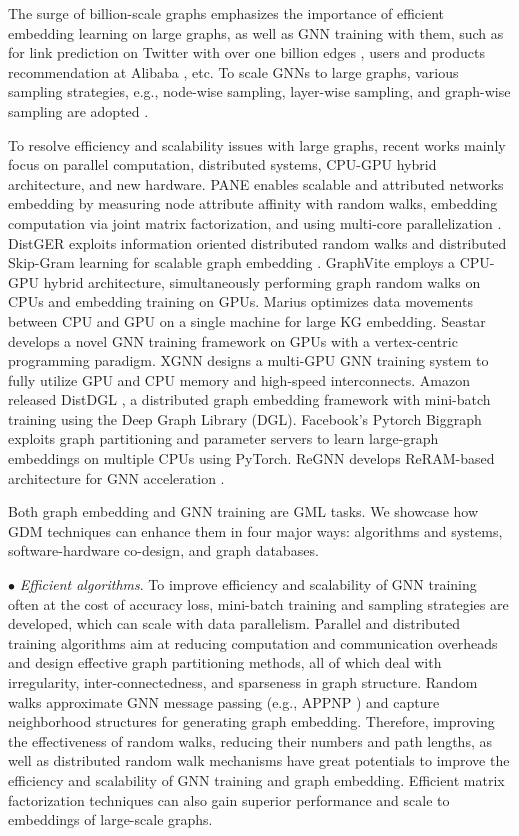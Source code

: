 \documentclass{sig-alternate-10pt}
\newcommand{\spara}[1]{\smallskip\noindent{\bf #1}}
\begin{document}
\medskip
\medskip

The surge of billion-scale graphs emphasizes the importance of efficient embedding learning on large graphs, as well as GNN training with them,
such as for link prediction on Twitter with over one billion edges \cite{GuptaGLSWZ13}, users and products recommendation at Alibaba \cite{WangHZZZL18}, etc.
To scale GNNs to large
graphs, various sampling strategies, e.g.,  node-wise sampling, layer-wise sampling, and graph-wise sampling are adopted \cite{LinYYFPCX23}.

To resolve efficiency and scalability issues with large graphs, recent works mainly focus on parallel computation,
distributed systems, CPU-GPU hybrid architecture, and  new hardware. PANE enables scalable and attributed networks
embedding by measuring node attribute affinity with random walks, embedding computation via joint matrix factorization,
and using multi-core parallelization \cite{YangSX0LB20}. DistGER exploits information oriented distributed random walks
and distributed Skip-Gram learning for scalable graph embedding \cite{FangKLWFLYC23}.
GraphVite \cite{ZhuXTQ19} employs a CPU-GPU hybrid architecture, simultaneously performing graph random walks on
CPUs and embedding training on GPUs. Marius \cite{MohoneyWXRV21} optimizes data movements between CPU and GPU on a
single machine for large KG embedding. Seastar \cite{WuMCJLZCY21} develops a novel GNN training
framework on GPUs with a vertex-centric programming paradigm.
XGNN \cite{TWCWYZL24} designs a multi-GPU GNN training system to fully utilize GPU and CPU memory and high-speed interconnects.
Amazon released DistDGL \cite{Zheng0WZSSGZK20},
a distributed graph embedding framework
with mini-batch training using the Deep Graph Library (DGL).
Facebook's Pytorch Biggraph \cite{LererWSLWBP19} exploits graph partitioning and parameter servers to learn large-graph
embeddings on multiple CPUs using PyTorch. ReGNN develops ReRAM-based  architecture for GNN acceleration \cite{LLJLZDXL22}.

\spara{Synergy.}
Both graph embedding and GNN training are GML tasks. We showcase how GDM techniques can enhance them in four major ways: algorithms and systems, software-hardware co-design, and graph databases.

\noindent $\bullet$ {\em Efficient algorithms}. To improve efficiency and scalability of GNN training often at the cost of accuracy loss, mini-batch training and sampling strategies are developed, which can scale with data parallelism. Parallel and distributed training algorithms aim at reducing computation and communication overheads and design effective graph partitioning methods, all of which deal with irregularity, inter-connectedness, and sparseness in graph structure. Random walks approximate GNN message passing (e.g., APPNP \cite{KlicperaBG19}) and capture neighborhood structures for generating graph embedding. Therefore, improving the effectiveness of random walks, reducing their numbers and path lengths, as well as distributed random walk mechanisms have great potentials to improve the efficiency and scalability of GNN training and graph embedding. Efficient matrix factorization techniques can also gain superior performance and scale to embeddings of large-scale graphs.
\end{document}
